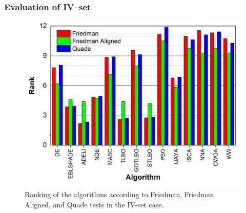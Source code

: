 \documentclass[a4paper,fleqn]{cas-dc}
\begin{document}



\subsubsection{Evaluation of IV--set}


\begin{figure}[]
	\centering
		\includegraphics[width=1.0\columnwidth]{FigRankT}
	  \caption{Ranking of the algorithms according to Friedman, Friedman Aligned, and Quade tests in the IV-set case.}\label{figRankIVset}
\end{figure}
\end{document}
